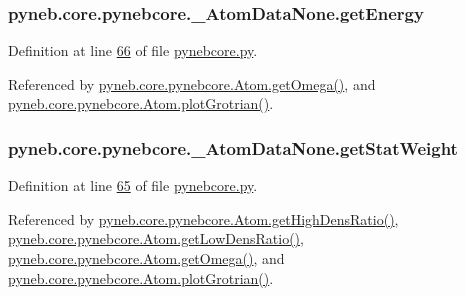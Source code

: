 \hypertarget{classpyneb_1_1core_1_1pynebcore_1_1___atom_data_none_ace59c545d211f79753ebdc9414eb1824}{
\subsubsection[{get\-Energy}]{\setlength{\rightskip}{0pt plus 5cm}pyneb.\-core.\-pynebcore.\-\_\-\-Atom\-Data\-None.\-get\-Energy}}\label{classpyneb_1_1core_1_1pynebcore_1_1___atom_data_none_ace59c545d211f79753ebdc9414eb1824}


Definition at line \hyperlink{pynebcore_8py_source_l00066}{66} of file \hyperlink{pynebcore_8py_source}{pynebcore.\-py}.



Referenced by \hyperlink{pynebcore_8py_source_l01324}{pyneb.\-core.\-pynebcore.\-Atom.\-get\-Omega()}, and \hyperlink{pynebcore_8py_source_l02443}{pyneb.\-core.\-pynebcore.\-Atom.\-plot\-Grotrian()}.

\hypertarget{classpyneb_1_1core_1_1pynebcore_1_1___atom_data_none_a45c07931f008fd0cfc0349222b14cd8c}{
\subsubsection[{get\-Stat\-Weight}]{\setlength{\rightskip}{0pt plus 5cm}pyneb.\-core.\-pynebcore.\-\_\-\-Atom\-Data\-None.\-get\-Stat\-Weight}}\label{classpyneb_1_1core_1_1pynebcore_1_1___atom_data_none_a45c07931f008fd0cfc0349222b14cd8c}


Definition at line \hyperlink{pynebcore_8py_source_l00065}{65} of file \hyperlink{pynebcore_8py_source}{pynebcore.\-py}.



Referenced by \hyperlink{pynebcore_8py_source_l01719}{pyneb.\-core.\-pynebcore.\-Atom.\-get\-High\-Dens\-Ratio()}, \hyperlink{pynebcore_8py_source_l01698}{pyneb.\-core.\-pynebcore.\-Atom.\-get\-Low\-Dens\-Ratio()}, \hyperlink{pynebcore_8py_source_l01324}{pyneb.\-core.\-pynebcore.\-Atom.\-get\-Omega()}, and \hyperlink{pynebcore_8py_source_l02443}{pyneb.\-core.\-pynebcore.\-Atom.\-plot\-Grotrian()}.

